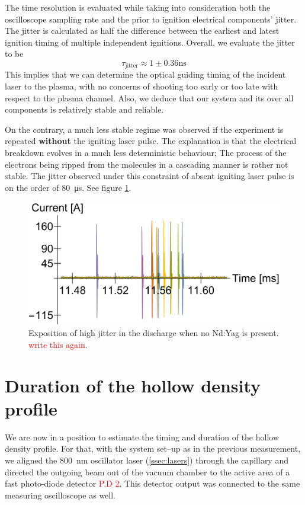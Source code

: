 \documentclass[justified,nofonts,nobib]{tufte-book}
\begin{document}
The time resolution is evaluated while taking into consideration both the oscilloscope sampling rate and the prior to ignition electrical components' jitter. The jitter is calculated as half the difference between the earliest and latest ignition timing of multiple independent ignitions. Overall, we evaluate the jitter to be
\begin{equation}
	\tau_\text{jitter}\approx 1\pm 0.36\si{\ns}
\end{equation}
This implies that we can determine the optical guiding timing of the incident laser to the plasma, with no concerns of shooting too early or too late with respect to the plasma channel. Also, we deduce that our system and its over all components is relatively stable and reliable.

On the contrary, a much less stable regime was observed if the experiment is repeated \textbf{without} the igniting laser pulse. The explanation is that the electrical breakdown evolves in a much less deterministic behaviour; The process of the electrons being ripped from the molecules in a cascading manner is rather not stable. The jitter observed under this constraint of absent igniting laser pulse is on the order of \SI{80}{\us}. See figure \ref{fig:multiple}.
\begin{figure}
    \centering
    \includegraphics[width=\textwidth]{figures/jitter/multiple.pdf}
    \caption{Exposition of high jitter in the discharge when no Nd:Yag is present. \textcolor{red}{write this again.}}
    \label{fig:multiple}
\end{figure}

\section{Duration of the hollow density profile}\label{sec:duration-of-guiding}
We are now in a position to estimate the timing and duration of the hollow density profile. For that, with the system set--up as in the previous measurement, we aligned the \SI{800}{\nm} oscillator laser (\ref{ssec:lasers}) through the capillary and directed the outgoing beam out of the vacuum chamber to the active area of a fast photo-diode detector \textcolor{red}{P.D 2}. This detector output was connected to the same measuring oscilloscope as well.
\end{document}
